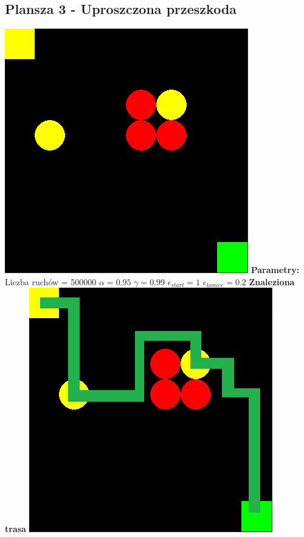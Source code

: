 \documentclass[a4paper,12pt]{article}
\begin{document}
\subsection{Plansza 3 - Uproszczona przeszkoda}
\includegraphics[scale=0.73]{testy/plansza3.png} \newline
\textbf{Parametry:}
Liczba ruchów = 500000
\newline \(\alpha = 0.95\)
\newline \(\gamma = 0.99\)
\newline \(\epsilon_{start} = 1\)
\newline \(\epsilon_{koniec} = 0.2\) \newline \newline
\textbf{\Large{Znaleziona trasa}} \newline \newline
\includegraphics[scale=0.73]{testy/plansza3trasa.png} \newline \newline
\end{document}
